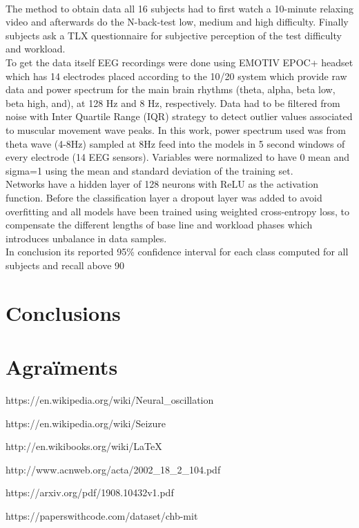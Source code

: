 ﻿\documentclass[10pt,a4paper,twocolumn,twoside]{article}
\begin{document}
\\
The method to obtain data all 16 subjects had to first watch a 10-minute relaxing video and afterwards do the N-back-test low, medium and high difficulty. Finally subjects ask a TLX questionnaire for subjective perception of the test difficulty and workload.
\\
To get the data itself EEG recordings were done using EMOTIV EPOC+ headset which has 14 electrodes placed according to the 10/20 system which provide raw data and power spectrum for the main brain rhythms (theta, alpha, beta low, beta high, and), at 128 Hz and 8 Hz, respectively. Data had to be filtered from noise with Inter Quartile Range (IQR) strategy to detect outlier values associated to muscular movement wave peaks. In this work, power spectrum used was from theta wave (4-8Hz) sampled at 8Hz feed into the models in 5 second windows of every electrode (14 EEG sensors). Variables were normalized to have 0 mean and
sigma=1 using the mean and standard deviation of the training set. 
\\
Networks have a hidden layer of 128 neurons with ReLU as the activation function. Before the classification layer a dropout layer was added to avoid overfitting and all models have been trained using weighted cross-entropy loss, to compensate the different lengths of base line and workload phases which introduces unbalance in data samples.
\\
In conclusion its reported 95\% confidence interval for each class computed for all subjects and recall above 90%



\section{Conclusions}



\section*{Agraïments}


\begin{thebibliography}{11}

https://en.wikipedia.org/wiki/Neural\_oscillation

https://en.wikipedia.org/wiki/Seizure

http://en.wikibooks.org/wiki/LaTeX

http://www.acnweb.org/acta/2002\_18\_2\_104.pdf

https://arxiv.org/pdf/1908.10432v1.pdf

https://paperswithcode.com/dataset/chb-mit



\end{thebibliography}
\end{document}
